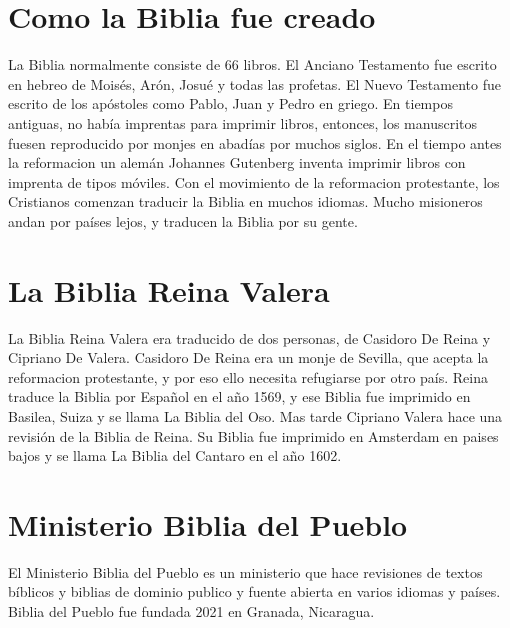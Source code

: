 \hypertarget{como-la-biblia-fue-creado}{%
\section{Como la Biblia fue creado}\label{como-la-biblia-fue-creado}}

La Biblia normalmente consiste de 66 libros. El Anciano Testamento fue
escrito en hebreo de Moisés, Arón, Josué y todas las profetas. El Nuevo
Testamento fue escrito de los apóstoles como Pablo, Juan y Pedro en
griego. En tiempos antiguas, no había imprentas para imprimir libros,
entonces, los manuscritos fuesen reproducido por monjes en abadías por
muchos siglos. En el tiempo antes la reformacion un alemán Johannes
Gutenberg inventa imprimir libros con imprenta de tipos móviles. Con el
movimiento de la reformacion protestante, los Cristianos comenzan
traducir la Biblia en muchos idiomas. Mucho misioneros andan por países
lejos, y traducen la Biblia por su gente.

\hypertarget{la-biblia-reina-valera}{%
\section{La Biblia Reina Valera}\label{la-biblia-reina-valera}}

La Biblia Reina Valera era traducido de dos personas, de Casidoro De
Reina y Cipriano De Valera. Casidoro De Reina era un monje de Sevilla,
que acepta la reformacion protestante, y por eso ello necesita
refugiarse por otro país. Reina traduce la Biblia por Español en el año
1569, y ese Biblia fue imprimido en Basilea, Suiza y se llama La Biblia
del Oso. Mas tarde Cipriano Valera hace una revisión de la Biblia de
Reina. Su Biblia fue imprimido en Amsterdam en paises bajos y se llama
La Biblia del Cantaro en el año 1602.

\hypertarget{ministerio-biblia-del-pueblo}{%
\section{Ministerio Biblia del
Pueblo}\label{ministerio-biblia-del-pueblo}}

El Ministerio Biblia del Pueblo es un ministerio que hace revisiones de
textos bíblicos y biblias de dominio publico y fuente abierta en varios
idiomas y países. Biblia del Pueblo fue fundada 2021 en Granada,
Nicaragua.
